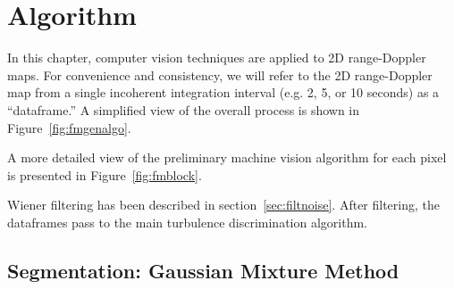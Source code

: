 \section{Algorithm}

In this chapter, computer vision techniques are applied to 2D range-Doppler maps. 
For convenience and consistency, we will refer to the 2D range-Doppler map from a single incoherent integration interval (e.g. 2, 5, or 10 seconds) as a ``dataframe.'' 
A simplified view of the overall process is shown in Figure~\ref{fig:fmgenalgo}.
 
A more detailed view of the preliminary machine vision algorithm for each pixel is presented in Figure~\ref{fig:fmblock}.

Wiener filtering has been described in section~\ref{sec:filtnoise}.
After filtering, the dataframes pass to the main turbulence discrimination algorithm.

\subsection{Segmentation: Gaussian Mixture Method}

